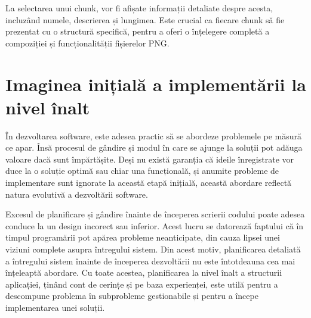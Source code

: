 \documentclass[a4paper,12pt]{report}
\begin{document}
La selectarea unui chunk, vor fi afișate informații detaliate despre acesta,
incluzând numele, descrierea și lungimea.
Este crucial ca fiecare chunk să fie prezentat cu o structură specifică,
pentru a oferi o înțelegere completă a compoziției și funcționalității fișierelor \ac{PNG}.


\section{Imaginea inițială a implementării la nivel înalt}

În dezvoltarea software, este adesea practic să se abordeze problemele pe măsură ce apar.
Însă procesul de gândire și modul în care se ajunge la soluții
pot adăuga valoare dacă sunt împărtășite.
Deși nu există garanția că ideile înregistrate vor duce
la o soluție optimă sau chiar una funcțională,
și anumite probleme de implementare sunt ignorate la această etapă inițială,
această abordare reflectă natura evolutivă a dezvoltării software.

Excesul de planificare și gândire înainte de începerea scrierii codului
poate adesea conduce la un design incorect sau inferior.
Acest lucru se datorează faptului că în timpul programării pot apărea probleme neanticipate,
din cauza lipsei unei viziuni complete asupra întregului sistem.
Din acest motiv, planificarea detaliată a întregului sistem înainte de începerea dezvoltării
nu este întotdeauna cea mai înțeleaptă abordare.
Cu toate acestea, planificarea la nivel înalt a structurii aplicației,
ținând cont de cerințe și pe baza experienței,
este utilă pentru a descompune problema în subprobleme gestionabile
și pentru a începe implementarea unei soluții.
\end{document}
